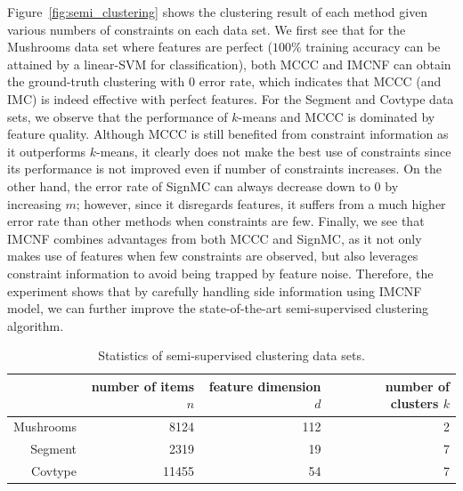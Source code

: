 \documentclass[twoside,11pt]{article}
\begin{document}
Figure~\ref{fig:semi_clustering} shows the clustering result of each method given various
numbers of constraints on each data set.
We first see that for the Mushrooms data set where features are perfect ($100\%$ training accuracy can
be attained by a linear-SVM for classification), both MCCC and IMCNF can obtain the ground-truth clustering
with $0$ error rate, which indicates that MCCC (and IMC) is indeed effective with perfect features.
For the Segment and Covtype data sets,
we observe that the performance of $k$-means and MCCC is dominated by feature quality.
Although MCCC is still benefited from constraint information as it outperforms $k$-means,
it clearly does not make the best use of constraints
since its performance is not improved even if number of constraints increases.
On the other hand,
the error rate of SignMC can always decrease down to $0$ by increasing $m$;
however, since it disregards features, it suffers from a much
higher error rate than other methods when constraints are few.  Finally, we see that
IMCNF combines advantages from both MCCC and SignMC, as it not only makes use of features when
few constraints are observed, but also leverages constraint information to avoid
being trapped by feature noise.
Therefore, the experiment shows that
by carefully handling side information using IMCNF model,
we can further improve the state-of-the-art semi-supervised clustering algorithm.

\begin{table}[t]
  \centering
\begin{tabular}{r|r|r|r}
  & number of items $n$ & feature dimension $d$ & number of clusters $k$ \\ \hline
  Mushrooms & 8124 & 112 & 2 \\
    Segment & 2319 & 19 & 7 \\
    Covtype & 11455 & 54 & 7 \\
\end{tabular}
\caption{Statistics of semi-supervised clustering data sets.}
\label{tab:semi_clustering}
\end{table}
\end{document}
